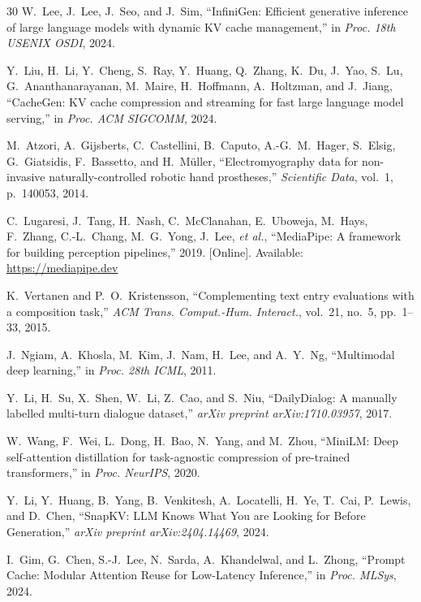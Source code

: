 \documentclass[journal]{IEEEtran}
\begin{document}
\begin{thebibliography}{30}
W.~Lee, J.~Lee, J.~Seo, and J.~Sim,
``{InfiniGen: Efficient generative inference of large language models with dynamic KV cache management},''
in \emph{Proc. 18th USENIX OSDI}, 2024.

Y.~Liu, H.~Li, Y.~Cheng, S.~Ray, Y.~Huang, Q.~Zhang, K.~Du, J.~Yao, S.~Lu, G.~Ananthanarayanan, M.~Maire, H.~Hoffmann, A.~Holtzman, and J.~Jiang,
``{CacheGen: KV cache compression and streaming for fast large language model serving},''
in \emph{Proc. ACM SIGCOMM}, 2024.

M.~Atzori, A.~Gijsberts, C.~Castellini, B.~Caputo, A.-G.~M.~Hager, S.~Elsig, G.~Giatsidis, F.~Bassetto, and H.~M\"{u}ller,
``{Electromyography data for non-invasive naturally-controlled robotic hand prostheses},''
\emph{Scientific Data}, vol.~1, p.~140053, 2014.

C.~Lugaresi, J.~Tang, H.~Nash, C.~McClanahan, E.~Uboweja, M.~Hays, F.~Zhang, C.-L.~Chang, M.~G.~Yong, J.~Lee, \emph{et al.},
``{MediaPipe: A framework for building perception pipelines},''
2019. [Online]. Available: \url{https://mediapipe.dev}

K.~Vertanen and P.~O.~Kristensson,
``{Complementing text entry evaluations with a composition task},''
\emph{ACM Trans. Comput.-Hum. Interact.}, vol.~21, no.~5, pp.~1--33, 2015.

J.~Ngiam, A.~Khosla, M.~Kim, J.~Nam, H.~Lee, and A.~Y.~Ng,
``{Multimodal deep learning},''
in \emph{Proc. 28th ICML}, 2011.

Y.~Li, H.~Su, X.~Shen, W.~Li, Z.~Cao, and S.~Niu,
``{DailyDialog: A manually labelled multi-turn dialogue dataset},''
\emph{arXiv preprint arXiv:1710.03957}, 2017.

W.~Wang, F.~Wei, L.~Dong, H.~Bao, N.~Yang, and M.~Zhou,
``{MiniLM: Deep self-attention distillation for task-agnostic compression of pre-trained transformers},''
in \emph{Proc. NeurIPS}, 2020.

Y.~Li, Y.~Huang, B.~Yang, B.~Venkitesh, A.~Locatelli, H.~Ye, T.~Cai, P.~Lewis, and D.~Chen,
``{SnapKV: LLM Knows What You are Looking for Before Generation},''
\emph{arXiv preprint arXiv:2404.14469}, 2024.

I.~Gim, G.~Chen, S.-J.~Lee, N.~Sarda, A.~Khandelwal, and L.~Zhong,
``{Prompt Cache: Modular Attention Reuse for Low-Latency Inference},''
in \emph{Proc. MLSys}, 2024.


\end{thebibliography}
\end{document}
